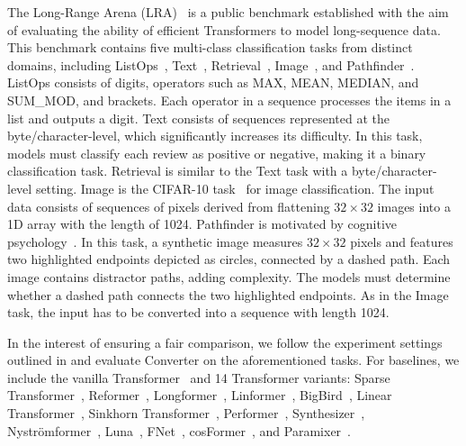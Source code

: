 The Long-Range Arena (LRA)~\citep{tay2021long} is a public benchmark established with the aim of evaluating the ability of efficient Transformers to model long-sequence data. This benchmark contains five multi-class classification tasks from distinct domains, including ListOps~\citep{nangia-bowman-2018-listops}, Text~\citep{maas-etal-2011-learning}, Retrieval~\citep{radev-etal-2009-acl}, Image~\citep{krizhevsky2009learning}, and Pathfinder~\citep{NEURIPS2018_ec895663,Kim2020Disentangling}. ListOps consists of digits, operators such as MAX, MEAN, MEDIAN, and SUM\_MOD, and brackets. Each operator in a sequence processes the items in a list and outputs a digit. Text consists of sequences represented at the byte/character-level, which significantly increases its difficulty. In this task, models must classify each review as positive or negative, making it a binary classification task. Retrieval is similar to the Text task with a byte/character-level setting. Image is the CIFAR-10 task~\citep{krizhevsky2009learning} for image classification. The input data consists of sequences of pixels derived from flattening $32 \times 32$ images into a 1D array with the length of 1024. Pathfinder is motivated by cognitive psychology~\citep{Houtkamp2010Parallel}. In this task, a synthetic image measures $32 \times 32$ pixels and features two highlighted endpoints depicted as circles, connected by a dashed path. Each image contains distractor paths, adding complexity. The models must determine whether a dashed path connects the two highlighted endpoints. As in the Image task, the input has to be converted into a sequence with length 1024.

In the interest of ensuring a fair comparison, we follow the experiment settings outlined in \citep{tay2021long} and evaluate Converter on the aforementioned tasks. For baselines, we include the vanilla Transformer~\citep{NIPS2017_3f5ee243} and 14 Transformer variants: Sparse Transformer~\citep{child2019generating}, Reformer~\citep{Kitaev2020Reformer}, Longformer~\citep{beltagy2020longformer}, Linformer~\citep{wang2020linformer}, BigBird~\citep{NEURIPS2020_c8512d14}, Linear Transformer~\citep{pmlr-v119-katharopoulos20a}, Sinkhorn Transformer~\citep{pmlr-v119-tay20a}, Performer~\citep{choromanski2021rethinking}, Synthesizer~\citep{pmlr-v139-tay21a}, Nystr{\"{o}}mformer~\citep{xiong2021Nystromformer}, Luna~\citep{ma2021luna}, FNet~\citep{lee-thorp-etal-2022-fnet}, cosFormer~\citep{zhen2022cosformer}, and Paramixer~\citep{9878955}.

